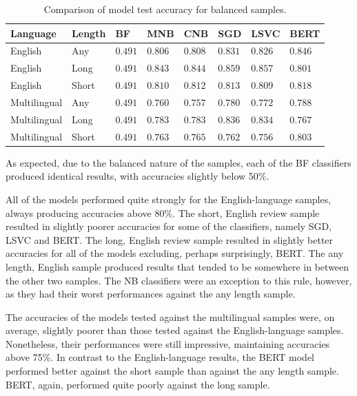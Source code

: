 \begin{table}[ht]
    \centering
    \begin{tabular}{l l | l l l l l l}
        \toprule
        \textbf{Language} & \textbf{Length} & \textbf{BF} & \textbf{MNB} & \textbf{CNB} & \textbf{SGD} & \textbf{LSVC} & \textbf{BERT}\\\midrule
        English & Any &$0.491$&$0.806$&$0.808$&$0.831$&$0.826$&$\mathbf{0.846}$\\
        English & Long & $0.491$&$0.843$&$0.844$&$\mathbf{0.859}$&$0.857$&$0.801$\\
        English & Short & $0.491$&$0.810$&$0.812$&$0.813$&$0.809$&$\mathbf{0.818}$\\\midrule
        Multilingual & Any &$0.491$&$0.760$&$0.757$&$0.780$&$0.772$&$\mathbf{0.788}$\\
        Multilingual & Long & $0.491$&$0.783$&$0.783$&$\mathbf{0.836}$&$0.834$&$0.767$\\
        Multilingual & Short & $0.491$&$0.763$&$0.765$&$0.762$&$0.756$&$\mathbf{0.803}$\\
        \bottomrule
    \end{tabular}
    \caption{Comparison of model test accuracy for balanced samples.}
    \label{tab:Res_RF_Pol_CompBal}
\end{table}

As expected, due to the balanced nature of the samples, each of the BF classifiers produced identical results, with accuracies slightly below 50\%.

All of the models performed quite strongly for the English-language samples, always producing accuracies above 80\%. The short, English review sample resulted in slightly poorer accuracies for some of the classifiers, namely SGD, LSVC and BERT. The long, English review sample resulted in slightly better accuracies for all of the models excluding, perhaps surprisingly, BERT. The any length, English sample produced results that tended to be somewhere in between the other two samples. The NB classifiers were an exception to this rule, however, as they had their worst performances against the any length sample.

The accuracies of the models tested against the multilingual samples were, on average, slightly poorer than those tested against the English-language samples. Nonetheless, their performances were still impressive, maintaining accuracies above 75\%. In contrast to the English-language results, the BERT model performed better against the short sample than against the any length sample. BERT, again, performed quite poorly against the long sample.

